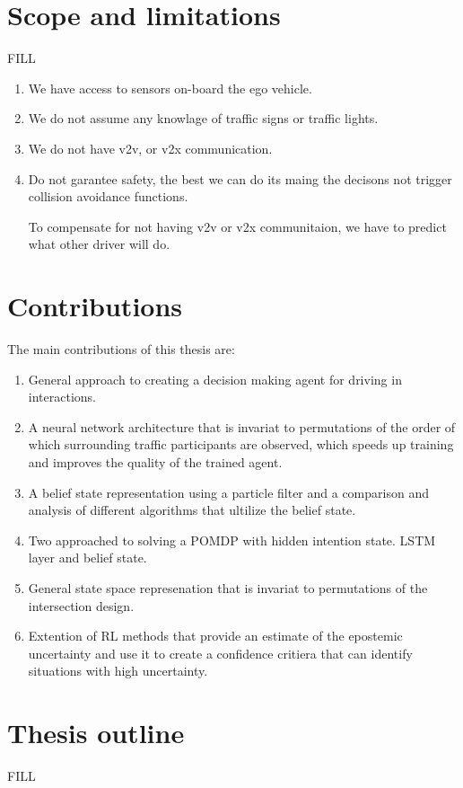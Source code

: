 \section{Scope and limitations}
FILL
\begin{enumerate}
	\item We have access to sensors on-board the ego vehicle. 
	\item We do not assume any knowlage of traffic signs or traffic lights. 
	\item We do not have v2v, or v2x communication. 
	\item Do not garantee safety, the best we can do its maing the decisons not trigger collision avoidance functions. 
	
	To compensate for not having v2v or v2x communitaion, we have to predict what other driver will do. 
	
\end{enumerate}


\section{Contributions}
The main contributions of this thesis are:
\begin{enumerate}
	\item General approach to creating a decision making agent for driving in interactions. 
	\item A neural network architecture that is invariat to permutations of the order of which surrounding traffic participants are observed, which speeds up training and improves the quality of the trained agent. 
	\item A belief state representation using a particle filter and a comparison and analysis of different algorithms that ultilize the belief state. 
	\item Two approached to solving a POMDP with hidden intention state. LSTM layer and belief state. 
	\item General state space represenation that is invariat to permutations of the intersection design. 
	\item Extention of RL methods that provide an estimate of the epostemic uncertainty and use it to create a confidence critiera that can identify situations with high uncertainty. 

\end{enumerate}


\section{Thesis outline}
FILL


